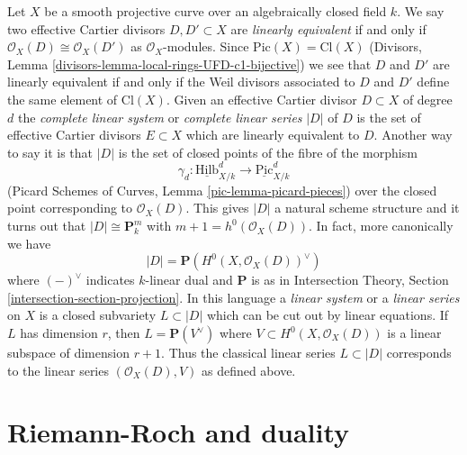 \begin{remark}
\label{remark-classical-linear-series}
Let $X$ be a smooth projective curve over an algebraically closed field $k$.
We say two effective Cartier divisors $D, D' \subset X$ are
{\it linearly equivalent} if and only if
$\mathcal{O}_X(D) \cong \mathcal{O}_X(D')$ as $\mathcal{O}_X$-modules.
Since $\text{Pic}(X) = \text{Cl}(X)$
(Divisors, Lemma \ref{divisors-lemma-local-rings-UFD-c1-bijective})
we see that $D$ and $D'$ are linearly equivalent
if and only if the Weil divisors associated to
$D$ and $D'$ define the same element of $\text{Cl}(X)$.
Given an effective Cartier divisor $D \subset X$ of degree $d$ the
{\it complete linear system} or {\it complete linear series} $|D|$ of $D$
is the set of effective Cartier divisors $E \subset X$
which are linearly equivalent to $D$.
Another way to say it is that $|D|$ is the set of closed
points of the fibre of the morphism
$$
\gamma_d :
\underline{\text{Hilb}}^d_{X/k}
\longrightarrow
\underline{\text{Pic}}^d_{X/k}
$$
(Picard Schemes of Curves, Lemma \ref{pic-lemma-picard-pieces})
over the closed point corresponding to $\mathcal{O}_X(D)$.
This gives $|D|$ a natural scheme structure and it
turns out that $|D| \cong \mathbf{P}^m_k$ with
$m + 1 = h^0(\mathcal{O}_X(D))$. In fact, more canonically we have
$$
|D| = \mathbf{P}(H^0(X, \mathcal{O}_X(D))^\vee)
$$
where $(-)^\vee$ indicates $k$-linear dual and $\mathbf{P}$ is as
in Intersection Theory, Section \ref{intersection-section-projection}.
In this language a {\it linear system} or a {\it linear series} on
$X$ is a closed subvariety $L \subset |D|$ which can be cut out by
linear equations. If $L$ has dimension $r$, then $L = \mathbf{P}(V^\vee)$
where $V \subset H^0(X, \mathcal{O}_X(D))$ is a linear subspace
of dimension $r + 1$. Thus the classical linear series
$L \subset |D|$ corresponds to the linear series $(\mathcal{O}_X(D), V)$
as defined above.
\end{remark}





\section{Riemann-Roch and duality}
\label{section-Riemann-Roch}

